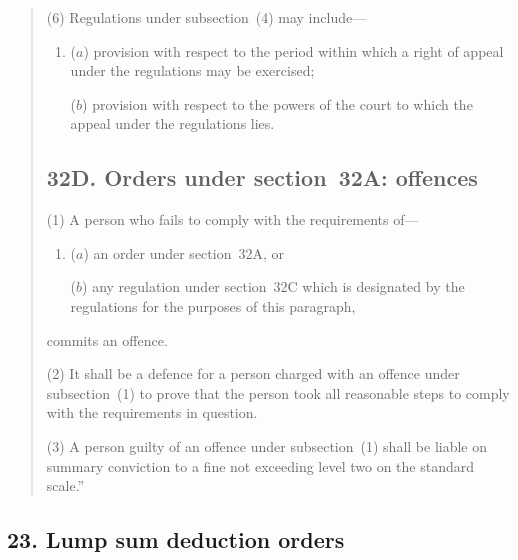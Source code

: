 \documentclass[12pt,a4paper]{article}
\begin{document}
\begin{quotation}
(6)
Regulations under subsection~(4) may include---
\begin{enumerate}\item[]
($a$) provision with respect to the period within which a right of appeal under the regulations may be exercised;

($b$) provision with respect to the powers of the court to which the appeal under the regulations lies.
\end{enumerate}

\subsection*{32D. Orders under section~32A: offences}

(1) A person who fails to comply with the requirements of---
\begin{enumerate}\item[]
($a$) an order under section~32A, or

($b$) any regulation under section~32C which is designated by the regulations for
the purposes of this paragraph, 
\end{enumerate}
commits an offence.

(2)
It shall be a defence for a person charged with an offence under subsection~(1) to prove that the person took all reasonable steps to comply with the requirements in question.

(3)
A person guilty of an offence under subsection~(1) shall be liable on summary conviction to a fine not exceeding level two on the standard scale.''
\end{quotation}

\subsection{23. Lump sum deduction orders}
\end{document}
